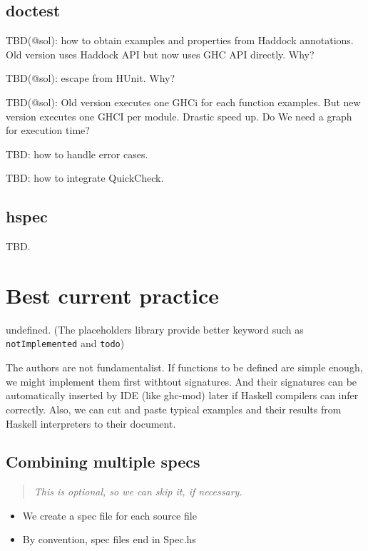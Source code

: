\documentclass[preprint]{sigplanconf}
\begin{document}
\subsection{doctest}

TBD(@sol): how to obtain examples and properties from Haddock annotations.
Old version uses Haddock API but now uses GHC API directly. Why?

TBD(@sol): escape from HUnit. Why?

TBD(@sol): Old version executes one GHCi for each function examples.
But new version executes one GHCI per module.
Drastic speed up. Do We need a graph for execution time?

TBD: how to handle error cases.

TBD: how to integrate QuickCheck.

\subsection{hspec}

TBD.

\section{Best current practice}

undefined. (The placeholders library provide better keyword such as {\tt notImplemented} and {\tt todo})

The authors are not fundamentalist.
If functions to be defined are simple enough,
we might implement them first withtout signatures.
And their signatures can be automatically
inserted by IDE (like ghc-mod) later
if Haskell compilers can infer correctly.
Also, we can cut and paste typical examples and their results
from Haskell interpreters to their document.

\subsection{Combining multiple specs}

\begin{quote}
\emph{This is optional, so we can skip it, if necessary.}
\end{quote}

\begin{itemize}
\item We create a spec file for each source file
\item By convention, spec files end in Spec.hs
\end{itemize}
\end{document}
